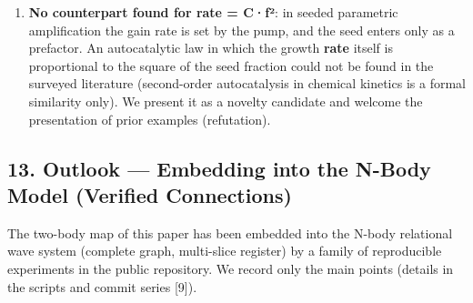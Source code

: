 \documentclass[
  a4paper,
]{article}
\begin{document}
\begin{enumerate}
  \(10^{-9}\)\ldots{}\(10^{-14}\)) has no counterpart. The Manley-Rowe
  relations {[}12{]} are a distant analogue of ``conservation laws
  constraining conversion paths,'' but those follow from Hamiltonian
  structure, whereas here conservation acts as the axiom that selects
  the vertex.
\item
  \textbf{No counterpart found for rate = C·f²}: in seeded parametric
  amplification the gain rate is set by the pump, and the seed enters
  only as a prefactor. An autocatalytic law in which the growth
  \textbf{rate} itself is proportional to the square of the seed
  fraction could not be found in the surveyed literature (second-order
  autocatalysis in chemical kinetics is a formal similarity only). We
  present it as a novelty candidate and welcome the presentation of
  prior examples (refutation).
\end{enumerate}

\subsection{13. Outlook --- Embedding into the N-Body Model (Verified
Connections)}\label{outlook-embedding-into-the-n-body-model-verified-connections}

The two-body map of this paper has been embedded into the N-body
relational wave system (complete graph, multi-slice register) by a
family of reproducible experiments in the public repository. We record
only the main points (details in the scripts and commit series {[}9{]}).
\end{document}

